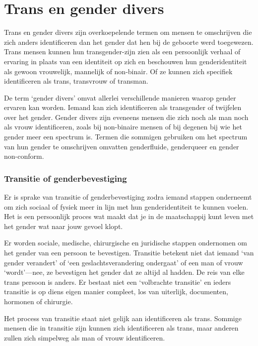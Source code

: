 \documentclass[12pt,openany]{book}
\begin{document}
\section*{Trans en gender divers}

Trans en gender divers zijn overkoepelende termen om mensen te omschrijven die zich anders identificeren dan het gender dat hen bij de geboorte werd toegewezen. Trans mensen kunnen hun transgender-zijn zien als een persoonlijk verhaal of ervaring in plaats van een identiteit op zich en beschouwen hun genderidentiteit als gewoon vrouwelijk, mannelijk of non-binair. Of ze kunnen zich specifiek identificeren als trans, transvrouw of transman.

De term ‘gender divers’ omvat allerlei verschillende manieren waarop gender ervaren kan worden. Iemand kan zich identificeren als transgender of twijfelen over het gender. Gender divers zijn eveneens mensen die zich noch als man noch als vrouw identificeren, zoals bij non-binaire mensen of bij degenen bij wie het gender meer een spectrum is. Termen die sommigen gebruiken om het spectrum van hun gender te omschrijven omvatten genderfluide, genderqueer en gender non-conform. 

\subsubsection*{Transitie of genderbevestiging}

Er is sprake van transitie of genderbevestiging zodra iemand stappen onderneemt om zich sociaal of fysiek meer in lijn met hun genderidentiteit te kunnen voelen. Het is een persoonlijk proces wat maakt dat je in de maatschappij kunt leven met het gender wat naar jouw gevoel klopt.

Er worden sociale, medische, chirurgische en juridische stappen ondernomen om het gender van een persoon te bevestigen. Transitie betekent niet dat iemand ‘van gender verandert’ of ‘een geslachtsverandering ondergaat’ of een man of vrouw ‘wordt’—nee, ze bevestigen het gender dat ze altijd al hadden. De reis van elke trans persoon is anders. Er bestaat niet een ‘volbrachte transitie’ en ieders transitie is op diens eigen manier compleet, los van uiterlijk, documenten, hormonen of chirurgie.  

Het process van transitie staat niet gelijk aan identificeren als trans. Sommige mensen die in transitie zijn kunnen zich identificeren als trans, maar anderen zullen zich simpelweg als man of vrouw identificeren.
\end{document}
